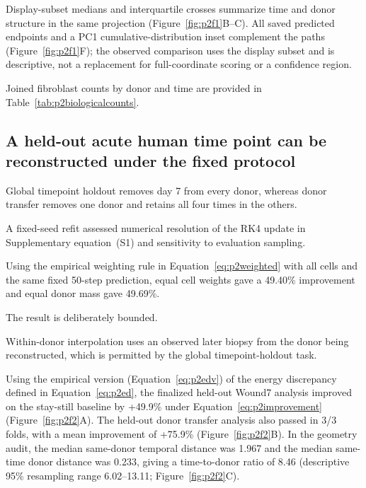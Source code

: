 \documentclass[10pt,a4paper]{article}
\begin{document}
Display-subset medians and interquartile crosses summarize time and donor structure in the same projection (Figure~\ref{fig:p2f1}B--C). All saved predicted endpoints and a PC1 cumulative-distribution inset complement the paths (Figure~\ref{fig:p2f1}F); the observed comparison uses the display subset and is descriptive, not a replacement for full-coordinate scoring or a confidence region.

Joined fibroblast counts by donor and time are provided in Table~\ref{tab:p2biologicalcounts}.

\subsection{A held-out acute human time point can be reconstructed under the fixed protocol}

Global timepoint holdout removes day 7 from every donor, whereas donor transfer removes one donor and retains all four times in the others.

A fixed-seed refit assessed numerical resolution of the RK4 update in Supplementary equation~(S1) and sensitivity to evaluation sampling.

Using the empirical weighting rule in Equation~\eqref{eq:p2weighted} with all cells and the same fixed 50-step prediction, equal cell weights gave a 49.40\% improvement and equal donor mass gave 49.69\%.

The result is deliberately bounded.

Within-donor interpolation uses an observed later biopsy from the donor being reconstructed, which is permitted by the global timepoint-holdout task.

\FloatBarrier
Using the empirical version (Equation~\eqref{eq:p2edv}) of the energy discrepancy defined in Equation~\eqref{eq:p2ed}, the finalized held-out Wound7 analysis improved on the stay-still baseline by +49.9\% under Equation~\eqref{eq:p2improvement} (Figure~\ref{fig:p2f2}A\label{call:p2f2}). The held-out donor transfer analysis also passed in 3/3 folds, with a mean improvement of +75.9\% (Figure~\ref{fig:p2f2}B). In the geometry audit, the median same-donor temporal distance was 1.967 and the median same-time donor distance was 0.233, giving a time-to-donor ratio of 8.46 (descriptive 95\% resampling range 6.02--13.11; Figure~\ref{fig:p2f2}C).
\end{document}
